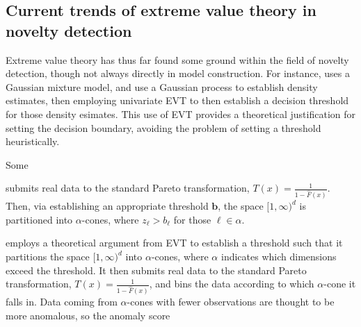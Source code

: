 \subsection{Current trends of extreme value theory in novelty detection}
Extreme value theory has thus far found some ground within the field of novelty 
    detection, though not always directly in model construction.  For instance,
    \cite{clifton2011} uses a Gaussian mixture model, and \cite{gu2021} use a
    Gaussian process to establish density estimates, then employing univariate 
    EVT to then establish a decision threshold for those density esimates.  This 
    use of EVT provides a theoretical justification for setting the decision
    boundary, avoiding the problem of setting a threshold heuristically.

Some 

\cite{goix2017} submits real data to the standard Pareto transformation, 
    $T(x) = \frac{1}{1 - \hat{F}(x)}$.  Then, via establishing an appropriate
    threshold $\bm{b}$, the space $[1,\infty)^d$ is partitioned into 
    $\alpha$-cones, where $z_{\ell} > b_{\ell}$ for those $\ell \in \alpha$.
    
\cite{goix2017} employs a theoretical argument from EVT to establish a threshold
  such that it partitions the space $[1,\infty)^d$ into $\alpha$-cones, where 
  $\alpha$ indicates which dimensions exceed the threshold.  It then submits 
  real data to the standard Pareto transformation,
  $T(x) = \frac{1}{1 - \hat{F}(x)}$, and bins the data according to which 
  $\alpha$-cone it falls in.  Data coming from $\alpha$-cones with fewer 
  observations are thought to be more anomalous, so the anomaly score 



